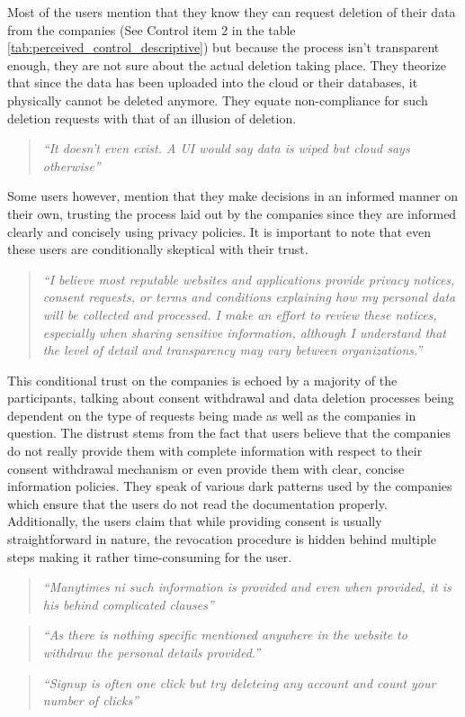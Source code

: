 Most of the users mention that they know they can request deletion of their data from the companies (See Control item 2 in the table \ref{tab:perceived_control_descriptive}) but because the process isn't transparent enough, they are not sure about the actual deletion taking place. They theorize that since the data has been uploaded into the cloud or their databases, it physically cannot be deleted anymore. They equate non-compliance for such  deletion requests with that of an illusion of deletion.

\begin{quote}
    \textit{``It doesn’t even exist. A UI would say data is wiped but cloud says otherwise''}
\end{quote}

Some users however, mention that they make decisions in an informed manner on their own, trusting the process laid out by the companies since they are informed clearly and concisely using privacy policies. It is important to note that even these users are conditionally skeptical with their trust.

\begin{quote}
    \textit{``I believe most reputable websites and applications provide privacy notices, consent requests, or terms and conditions explaining how my personal data will be collected and processed. I make an effort to review these notices, especially when sharing sensitive information, although I understand that the level of detail and transparency may vary between organizations.''}
\end{quote}

This conditional trust on the companies is echoed by a majority of the participants, talking about consent withdrawal and data deletion processes being dependent on the type of requests being made as well as the companies in question. The distrust stems from the fact that users believe that the companies do not really provide them with complete information with respect to their consent withdrawal mechanism or even provide them with clear, concise information policies. They speak of various dark patterns used by the companies which ensure that the users do not read the documentation properly. Additionally, the users claim that while providing consent is usually straightforward in nature, the revocation procedure is hidden behind multiple steps making it rather time-consuming for the user. 

\begin{quote}
    \textit{``Manytimes ni such information is provided and even when provided, it is his behind complicated clauses''}
\end{quote}
\begin{quote}
    \textit{``As there is nothing specific mentioned anywhere in the website to withdraw the personal details provided.''}
\end{quote}
\begin{quote}
   \textit{``Signup is often one click but try deleteing any account and count your number of clicks''}
\end{quote}

